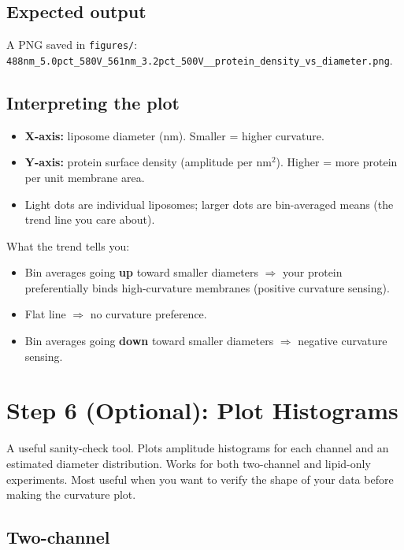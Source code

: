 \documentclass[11pt]{article}
\newcommand{\code}[1]{\texttt{#1}}
\begin{document}
\subsection*{Expected output}

A PNG saved in \code{figures/}:
\code{488nm\_5.0pct\_580V\_561nm\_3.2pct\_500V\_\_protein\_density\_vs\_diameter.png}.

\subsection*{Interpreting the plot}

\begin{itemize}[leftmargin=*]
    \item \textbf{X-axis:} liposome diameter (nm). Smaller = higher
    curvature.
    \item \textbf{Y-axis:} protein surface density (amplitude per
    nm$^2$). Higher = more protein per unit membrane area.
    \item Light dots are individual liposomes; larger dots are
    bin-averaged means (the trend line you care about).
\end{itemize}

What the trend tells you:

\begin{itemize}[leftmargin=*]
    \item Bin averages going \textbf{up} toward smaller diameters
    $\Rightarrow$ your protein preferentially binds high-curvature
    membranes (positive curvature sensing).
    \item Flat line $\Rightarrow$ no curvature preference.
    \item Bin averages going \textbf{down} toward smaller diameters
    $\Rightarrow$ negative curvature sensing.
\end{itemize}

\section{Step 6 (Optional): Plot Histograms}

A useful sanity-check tool. Plots amplitude histograms for each
channel and an estimated diameter distribution. Works for both
two-channel and lipid-only experiments. Most useful when you want to
verify the shape of your data before making the curvature plot.

\subsection*{Two-channel}
\end{document}
